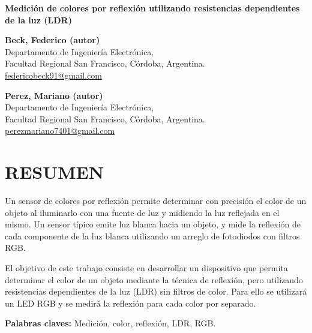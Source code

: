 \documentclass[12pt,a4paper,twoside,fleqn]{article}
\begin{document}
\renewcommand\refname {}
\renewcommand\headrulewidth{0pt} %
\fancyhead{} %
\fancyfoot{} %
\pagestyle{fancy}
\setlength{\headheight}{24.0pt}



\fancyfoot[L]{\thepage}

\vspace{\fill}
{\huge \noindent \textbf{Medición de colores por reflexión utilizando resistencias dependientes de la luz (LDR)}} %
\vspace{1.5cm}
\par
\noindent
\textbf{Beck, Federico (autor)}\\
Departamento de Ingeniería Electrónica,\\ Facultad Regional San Francisco, Córdoba, Argentina.\\
\href{mailto:federicobeck91@gmail.com}{federicobeck91@gmail.com}\par
\vspace{0.5cm}
\noindent
\textbf{Perez, Mariano (autor)}\\
Departamento de Ingeniería Electrónica,\\ Facultad Regional San Francisco, Córdoba, Argentina.\\
\href{mailto:perezmariano7401@gmail.com}{perezmariano7401@gmail.com}\par

\section*{RESUMEN}
Un sensor de colores por reflexión permite determinar con precisión el color de un objeto al iluminarlo con una fuente de luz y midiendo la luz reflejada en el mismo. Un sensor típico emite luz blanca hacia un objeto, y mide la reflexión de cada componente de la luz blanca utilizando un arreglo de fotodiodos con filtros RGB. 

El objetivo de este trabajo consiste en desarrollar un dispositivo que permita determinar el color de un objeto mediante la técnica de reflexión, pero utilizando resistencias dependientes de la luz (LDR) sin filtros de color. Para ello se utilizará un LED RGB y se medirá la reflexión para cada color por separado.
\par
\noindent\textbf{Palabras claves:} Medición, color, reflexión, LDR, RGB.
\end{document}
